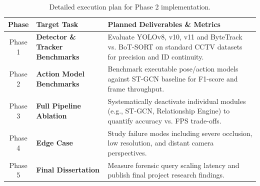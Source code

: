 \documentclass[11pt, a4paper]{article}
\begin{document}
\begin{table}[H]
\centering
\small
\renewcommand{\arraystretch}{1.3}
\begin{tabularx}{\textwidth}{|c|>{\hsize=0.3\hsize\bfseries}X|>{\hsize=0.6\hsize}X|}
\hline
\textbf{Phase} & \textbf{Target Task} & \textbf{Planned Deliverables \& Metrics} \\
\hline
Phase 1 & Detector \& Tracker Benchmarks & Evaluate YOLOv8, v10, v11 and ByteTrack vs. BoT-SORT on standard CCTV datasets for precision and ID continuity. \\
\hline
Phase 2 & Action Model Benchmarks & Benchmark executable pose/action models against ST-GCN baseline for F1-score and frame throughput. \\
Phase 3 & Full Pipeline Ablation & Systematically deactivate individual modules (e.g., ST-GCN, Relationship Engine) to quantify accuracy vs. FPS trade-offs. \\
\hline
Phase 4 & Edge Case & Study failure modes including severe occlusion, low resolution, and distant camera perspectives. \\
\hline
Phase 5 & Final Dissertation & Measure forensic query scaling latency and publish final project research findings. \\
\hline
\end{tabularx}
\caption{Detailed execution plan for Phase 2 implementation.}
\end{table}

\nocite{*}


\end{document}
